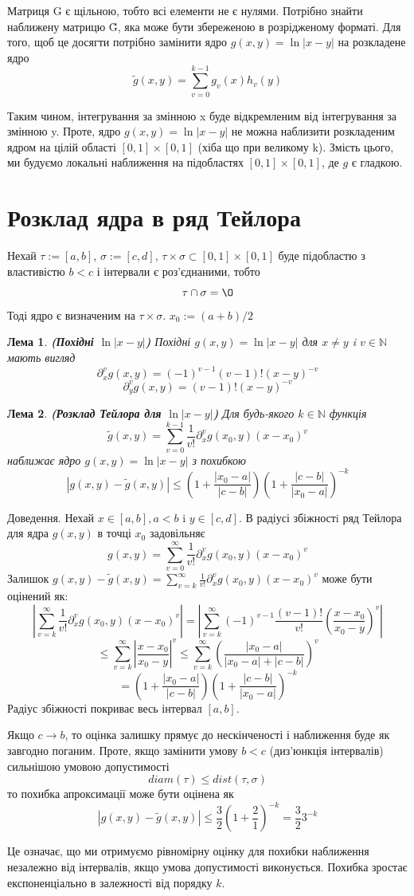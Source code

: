 \documentclass[12pt]{report}
\begin{document}
	\par Матриця G є щільною, тобто всі елементи не є нулями. Потрібно знайти наближену матрицю \~G, яка може бути збереженою в розрідженому форматі. Для того, щоб це досягти потрібно замінити ядро $g(x,y)=\ln|x-y|$ на розкладене ядро $$\tilde{g}(x,y)=\sum_{v=0}^{k-1}g_v(x)h_v(y)$$
	\par Таким чином, інтегрування за змінною x буде відкремленим від інтегрування за змінною y. Проте, ядро  $g(x,y)=\ln|x-y|$ не можна наблизити розкладеним ядром на цілій області $[0,1]\times[0,1]$ (хіба що при великому k). Змість цього, ми будуємо локальні наближення на підобластях $[0,1]\times[0,1]$, де $g$ є гладкою.
	\section{Розклад ядра в ряд Тейлора}
	\hspace{0.8cm}Нехай $\tau:=[a,b]$, $\sigma:=[c,d]$, $\tau\times\sigma\subset[0,1]\times[0,1]$ буде підобластю з властивістю $b<c$ і інтервали є роз'єднаними, тобто $$\tau\cap\sigma=\O$$
	Тоді ядро є визначеним на $\tau\times\sigma$. $x_0:=(a+b)/2$
	\newtheorem{Lem}{Лема}[chapter]
	\begin{Lem}
		{\bf (Похідні $\ln|x-y|$)} Похідні $g(x,y)=\ln|x-y|$ для $x\not=y$ i $v\in \mathbb{N}$ мають вигляд
		$$\partial^v_xg(x,y)=(-1)^{v-1}(v-1)!(x-y)^{-v}$$
		$$\partial^v_yg(x,y)=(v-1)!(x-y)^{-v}$$
	\end{Lem}
	\begin{Lem}
	{\bf (Розклад Тейлора для $\ln|x-y|$)} Для будь-якого $k\in \mathbb{N}$ функція 
	$$\tilde{g}(x,y)=\sum_{v=0}^{k-1}\frac{1}{v!}\partial^v_xg(x_0,y)(x-x_0)^v$$
	наближає ядро $g(x,y)=\ln|x-y|$ з похибкою
	$$|g(x,y)-\tilde{g}(x,y)|\le(1+\frac{|x_0-a|}{|c-b|})(1+\frac{|c-b|}{|x_0-a|})^{-k}$$
	\end{Lem}
	 Доведення. Нехай $x\in [a,b],a<b$ i $y\in [c,d]$. В радіусі збіжностi ряд Тейлора для ядра $g(x,y)$ в точці $x_0$ задовільняє $$g(x,y)=\sum_{v=0}^{\infty}\frac{1}{v!}\partial^v_xg(x_0,y)(x-x_0)^v$$
	Залишок $g(x,y)-\tilde{g}(x,y)=\sum_{v=k}^{\infty}\frac{1}{v!}\partial^v_xg(x_0,y)(x-x_0)^v$ може бути оцінений як:
	$$|\sum_{v=k}^{\infty}\frac{1}{v!}\partial^v_xg(x_0,y)(x-x_0)^v|= |\sum_{v=k}^{\infty}(-1)^{v-1}\frac{(v-1)!}{v!}\genfrac{(}{)}{1pt}{0}{x-x_0}{x_0-y}^v|$$
	$$\le \sum_{v=k}^{\infty}|\frac{x-x_0}{x_0-y}|^v\le\sum_{v=k}^{\infty}\genfrac{(}{)}{1pt}{0}{|x_0-a|}{|x_0-a|+|c-b|}^v $$
	$$=(1+\frac{|x_0-a|}{|c-b|})(1+\frac{|c-b|}{|x_0-a|})^{-k}$$
	\newline Радіус збіжності покриває весь інтервал $[a,b]$. 
	\newline
	\par Якщо $c\rightarrow b$, то оцінка залишку прямує до нескінченості і наближення буде як завгодно поганим. Проте, якщо замінити умову $b<c$ (диз'юнкція інтервалів) сильнішою умовою допустимості
	$$diam(\tau)\le dist(\tau,\sigma)$$
	то похибка апроксимації може бути оцінена як 
	$$|g(x,y)-\tilde{g}(x,y)|\le\frac{3}{2}(1+\frac{2}{1})^{-k}=\frac{3}{2}3^{-k}$$
	\par Це означає, що ми отримуємо рівномірну оцінку для похибки наближення незалежно від інтервалів, якщо умова допустимості виконується. Похибка зростає експоненціально в залежності від порядку $k$.
\end{document}
